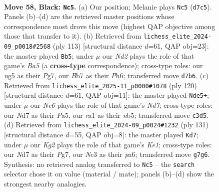 \documentclass[11pt]{article}
\begin{document}
\clearpage

\begin{figure}[p]\centering
\begin{subfigure}{0.46\textwidth}\centering
\resizebox{\linewidth}{!}{%
\newchessgame
\chessboard[
  setfen={8/Pb1n2k1/4B3/5pN1/1pN2P2/1Pn3P1/5K1P/R7 b - - 2 58},
  showmover=false,
  pgfstyle=straightmove, color=movearrow, markmove={d7-c5}
]}
\caption{}
\end{subfigure}\hfill
\begin{subfigure}{0.46\textwidth}\centering
\resizebox{\linewidth}{!}{%
\newchessgame
\chessboard[
  setfen={8/2k2pp1/p6p/P1K5/bP2P3/R4PP1/4n3/8 b - - 2 57},
  showmover=false,
  pgfstyle=straightmove, color=movearrow, markmove={a4-b5}
]}
\caption{}
\end{subfigure}
\\[4pt]
\begin{subfigure}{0.46\textwidth}\centering
\resizebox{\linewidth}{!}{%
\newchessgame
\chessboard[
  setfen={8/1b1N4/p3p1kp/Pn4p1/1b2p1N1/6PP/1B3P2/5K2 w - - 29 61},
  showmover=false,
  pgfstyle=straightmove, color=movearrow, markmove={d7-e5}
]}
\caption{}
\end{subfigure}\hfill
\begin{subfigure}{0.46\textwidth}\centering
\resizebox{\linewidth}{!}{%
\newchessgame
\chessboard[
  setfen={4k3/6p1/P2Np2p/1P2P2P/6Pn/6K1/8/r7 b - - 4 66},
  showmover=false,
  pgfstyle=straightmove, color=movearrow, markmove={e8-d7}
]}
\caption{}
\end{subfigure}
\caption{\textbf{Move 58, Black: \texttt{Nc5}.} (a) Our position; Melanie plays \texttt{Nc5} (\texttt{d7c5}). Panels (b)--(d) are the retrieved master positions whose correspondence most drove this move (highest QAP objective among those that transfer to it). (b) Retrieved from \texttt{lichess\_elite\_2024-09\_p0018\#2568} (ply 113) [structural distance $d$=61, QAP obj=23]: the master played \texttt{Bb5}; under $\mu$ our \emph{Nd2} plays the role of that game's \emph{Ba5} (a \textbf{cross-type} correspondence); cross-type roles: our \emph{n}g5 as their \emph{P}g7, our \emph{B}b7 as their \emph{P}h6; transferred move \texttt{d7b6}. (c) Retrieved from \texttt{lichess\_elite\_2025-11\_p0000\#1078} (ply 120) [structural distance $d$=61, QAP obj=11]: the master played \texttt{Nde5+}; under $\mu$ our \emph{Nc6} plays the role of that game's \emph{Nd7}; cross-type roles: our \emph{N}d7 as their \emph{P}a5, our \emph{r}a1 as their \emph{n}b5; transferred move \texttt{c3d5}. (d) Retrieved from \texttt{lichess\_elite\_2024-09\_p0024\#1232} (ply 131) [structural distance $d$=55, QAP obj=8]: the master played \texttt{Kd7}; under $\mu$ our \emph{Kg2} plays the role of that game's \emph{Ke1}; cross-type roles: our \emph{N}d7 as their \emph{P}g7, our \emph{N}c3 as their \emph{p}a6; transferred move \texttt{g7g6}. Synthesis: no retrieved analog transferred to \texttt{Nc5} -- the \texttt{search} selector chose it on value (material / mate); panels (b)--(d) show the strongest nearby analogies.}
\label{fig:thought-m115}
\end{figure}
\end{document}
